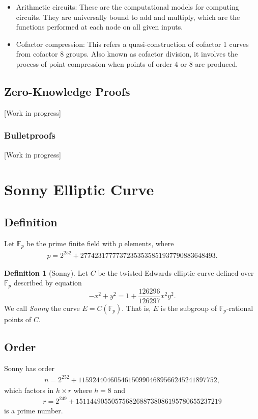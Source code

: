 \documentclass{article}
\newcommand{\Fp}{\ensuremath{\mathbb{F}_p}}
\theoremstyle{definition}
\newtheorem{defn}[thm]{Definition}
\theoremstyle{remark}
\begin{document}
\begin{itemize}
		\item Arithmetic circuits: These are the computational models for computing circuits. They are universally bound to add and multiply, which are the functions performed at each node on all given inputs.
		
		\item Cofactor compression: This refers a quasi-construction of cofactor 1 curves from cofactor 8 groups. Also known as cofactor division, it involves the process of point compression when points of order 4 or 8 are produced. 
		
	\end{itemize}
	
	\subsection{Zero-Knowledge Proofs}
	
	[Work in progress]
	
	\subsubsection{Bulletproofs}
	
	[Work in progress]
	
	\newpage
	
	\section{Sonny Elliptic Curve}
	
	
	
	\subsection{Definition}
	\noindent
	Let $\Fp$ be the prime finite field with $p$ elements, where 
	\begin{align*}
		p = 2^{252} + 27742317777372353535851937790883648493.
	\end{align*}
	
	\begin{defn}[Sonny]
		Let $C$ be the twisted Edwards elliptic curve defined over $\Fp$ 
		described by equation 
		$$ -x^2 + y^2 = 1 + \frac{126296}{126297}x^2y^2.	$$
		We call {\it Sonny} the curve $E = C(\Fp)$. That is, $E$ is the subgroup of $\Fp$-rational points of $C$.
	\end{defn}
	\subsection{Order}
	\noindent Sonny has order 
	\begin{align*}
		n = 2^{252}+115924404605461509904689566245241897752,
	\end{align*}
	which factors in $h \times r$ where $h=8$ and 
	\begin{align*}
		r = 2^{249}+15114490550575682688738086195780655237219
	\end{align*}
	is a prime number.\\
	
\end{document}
